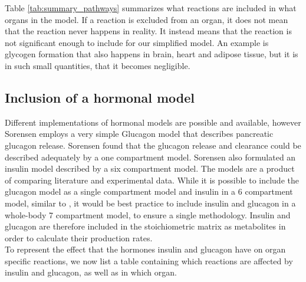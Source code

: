 \documentclass{IEEEtran}
\begin{document}
Table \ref{tab:summary_pathways} summarizes what reactions are included in what organs in the model. If a reaction is excluded from an organ, it does not mean that the reaction never happens in reality. It instead means that the reaction is not significant enough to include for our simplified model. An example is glycogen formation that also happens in brain, heart and adipose tissue, but it is in such small quantities, that it becomes negligible. \\




\subsection{Inclusion of a hormonal model}
\label{sec:hormonal_model}



Different implementations of hormonal models are possible and available, however Sorensen \cite{sorensen_1978} employs a very simple Glucagon model that describes pancreatic glucagon release. Sorensen found that the glucagon release and clearance could be described adequately by a one compartment model. Sorensen also formulated an insulin model described by a six compartment model. The models are a product of comparing literature and experimental data.
While it is possible to include the glucagon model as a single compartment model and insulin in a 6 compartment model, similar to \cite{panunzi_pompa_borri_piemonte_gaetano_2020,sorensen_1978}, it would be best practice to include insulin and glucagon in a whole-body 7 compartment model, to ensure a single methodology. Insulin and glucagon are therefore included in the stoichiometric matrix as metabolites in order to calculate their production rates. \\

To represent the effect that the hormones insulin and glucagon have on organ specific reactions, we now list a table containing which reactions are affected by insulin and glucagon, as well as in which organ. \\
\end{document}
